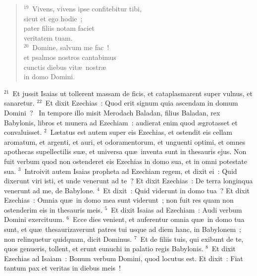\begin{flushleft}
\begin{verse}
${}^{19}$~Vivens, vivens ipse confitebitur tibi,\\ sicut et ego hodie~;\\ pater filiis notam faciet\\ veritatem tuam.\\
${}^{20}$~Domine, salvum me fac~!\\ et psalmos nostros cantabimus\\ cunctis diebus vit\ae\ nostr\ae \\ in domo Domini.\end{verse}\end{flushleft}


${}^{21}$~Et jussit Isaias ut tollerent massam de ficis, et cataplasmarent super vulnus, et sanaretur.
${}^{22}$~Et dixit Ezechias~: Quod erit signum quia ascendam in domum Domini~?
~In tempore illo misit Merodach Baladan, filius Baladan, rex Babylonis, libros et munera ad Ezechiam~: audierat enim quod \ae grotasset et convaluisset.
${}^{2}$~L\ae tatus est autem super eis Ezechias, et ostendit eis cellam aromatum, et argenti, et auri, et odoramentorum, et unguenti optimi, et omnes apothecas supellectilis su\ae , et universa qu\ae\ inventa sunt in thesauris ejus. Non fuit verbum quod non ostenderet eis Ezechias in domo sua, et in omni potestate sua.
${}^{3}$~Introivit autem Isaias propheta ad Ezechiam regem, et dixit ei~: Quid dixerunt viri isti, et unde venerunt ad te~? Et dixit Ezechias~: De terra longinqua venerunt ad me, de Babylone.
${}^{4}$~Et dixit~: Quid viderunt in domo tua~? Et dixit Ezechias~: Omnia qu\ae\ in domo mea sunt viderunt~; non fuit res quam non ostenderim eis in thesauris meis.
${}^{5}$~Et dixit Isaias ad Ezechiam~: Audi verbum Domini exercituum.
${}^{6}$~Ecce dies venient, et auferentur omnia qu\ae\ in domo tua sunt, et qu\ae\ thesaurizaverunt patres tui usque ad diem hanc, in Babylonem~; non relinquetur quidquam, dicit Dominus.
${}^{7}$~Et de filiis tuis, qui exibunt de te, quos genueris, tollent, et erunt eunuchi in palatio regis Babylonis.
${}^{8}$~Et dixit Ezechias ad Isaiam~: Bonum verbum Domini, quod locutus est. Et dixit~: Fiat tantum pax et veritas in diebus meis~!
